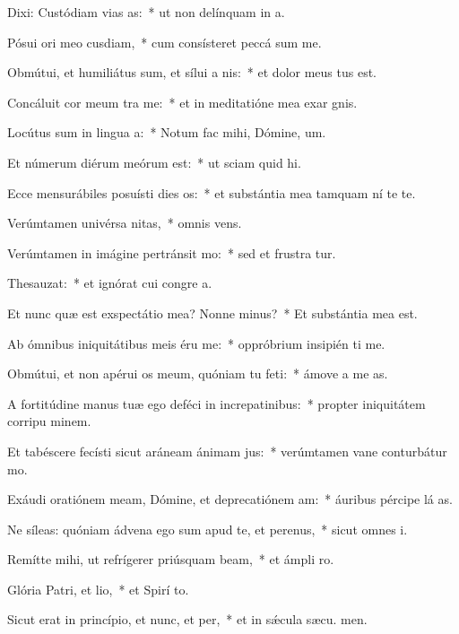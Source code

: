 \item Dixi: Custódiam vias as:~* ut non delínquam in  a.
\item Pósui ori meo cusdiam,~* cum consísteret peccá sum me.
\item Obmútui, et humiliátus sum, et sílui a nis:~* et dolor meus tus est.
\item Concáluit cor meum tra me:~* et in meditatióne mea exar gnis.
\item Locútus sum in lingua a:~* Notum fac mihi, Dómine,  um.
\item Et númerum diérum meórum  est:~* ut sciam quid  hi.
\item Ecce mensurábiles posuísti dies os:~* et substántia mea tamquam ní te te.
\item Verúmtamen univérsa nitas,~* omnis  vens.
\item Verúmtamen in imágine pertránsit mo:~* sed et frustra tur.
\item Thesauzat:~* et ignórat cui congre a.
\item Et nunc quæ est exspectátio mea? Nonne minus?~* Et substántia mea   est.
\item Ab ómnibus iniquitátibus meis éru me:~* oppróbrium insipién ti me.
\item Obmútui, et non apérui os meum, quóniam tu feti:~* ámove a me  as.
\item A fortitúdine manus tuæ ego deféci in increpatinibus:~* propter iniquitátem corripu minem.
\item Et tabéscere fecísti sicut aráneam ánimam jus:~* verúmtamen vane conturbátur  mo.
\item Exáudi oratiónem meam, Dómine, et deprecatiónem am:~* áuribus pércipe lá as.
\item Ne síleas: quóniam ádvena ego sum apud te, et perenus,~* sicut omnes  i.
\item Remítte mihi, ut refrígerer priúsquam beam,~* et ámpli  ro.
\item Glória Patri, et lio,~* et Spirí to.
\item Sicut erat in princípio, et nunc, et per,~* et in sǽcula sæcu. men.
